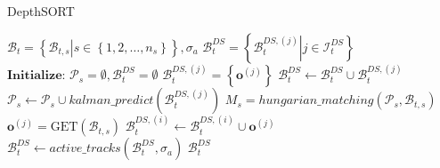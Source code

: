     \begin{algorithm}[t]
        \caption{DepthSORT}
        \label{alg:DepthSORT}
        \begin{algorithmic}[1]
            \REQUIRE $\mathcal{B}_t = \left\{\left.\mathcal{B}_{t,s}\right|s \in \left\{1,2,\dots,n_s\right\}\right\}, \sigma_a$
            \ENSURE $\mathcal{B}_t^{DS} = \left\{\left.\mathcal{B}_t^{DS, (j)}\right|j \in \mathcal{I}_t^{DS}\right\}$
            \STATE $\textbf{Initialize: } \mathcal{P}_s = \emptyset, \mathcal{B}_t^{DS}=\emptyset$
                \STATE $\mathcal{B}_t^{DS, (j)} = \left\{\bm{o}^{(j)}\right\}$ 
                \STATE $\mathcal{B}_t^{DS} \leftarrow \mathcal{B}_t^{DS} \cup \mathcal{B}_t^{DS, (j)}$
            \ENDFOR
                    \STATE $\mathcal{P}_s \leftarrow \mathcal{P}_s \cup kalman\_predict(\mathcal{B}_t^{DS, (j)})$
                \ENDFOR
                \STATE $M_{s} = hungarian\_matching(\mathcal{P}_s, \mathcal{B}_{t,s})$
                    \STATE $\bm{o}^{(j)} = \text{GET}(\mathcal{B}_{t,s})$
                    \STATE $\mathcal{B}_t^{DS,(i)} \leftarrow \mathcal{B}_t^{DS,(i)} \cup \bm{o}^{(j)}$
                \ENDFOR
                \STATE $\mathcal{B}_t^{DS} \leftarrow active\_tracks(\mathcal{B}_t^{DS}, \sigma_a)$
            \ENDFOR
            \RETURN $\mathcal{B}_t^{DS}$
        \end{algorithmic}
    \end{algorithm}

